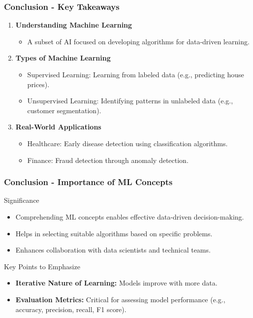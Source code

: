 \documentclass[aspectratio=169]{beamer}
\begin{document}
\begin{frame}[fragile]
    \frametitle{Conclusion - Key Takeaways}
    \begin{enumerate}
        \item \textbf{Understanding Machine Learning}
        \begin{itemize}
            \item A subset of AI focused on developing algorithms for data-driven learning.
        \end{itemize}

        \item \textbf{Types of Machine Learning}
        \begin{itemize}
            \item Supervised Learning: Learning from labeled data (e.g., predicting house prices).
            \item Unsupervised Learning: Identifying patterns in unlabeled data (e.g., customer segmentation).
        \end{itemize}

        \item \textbf{Real-World Applications}
        \begin{itemize}
            \item Healthcare: Early disease detection using classification algorithms.
            \item Finance: Fraud detection through anomaly detection.
        \end{itemize}
    \end{enumerate}
\end{frame}

\begin{frame}[fragile]
    \frametitle{Conclusion - Importance of ML Concepts}
    \begin{block}{Significance}
        \begin{itemize}
            \item Comprehending ML concepts enables effective data-driven decision-making.
            \item Helps in selecting suitable algorithms based on specific problems.
            \item Enhances collaboration with data scientists and technical teams.
        \end{itemize}
    \end{block}
    
    \begin{block}{Key Points to Emphasize}
        \begin{itemize}
            \item \textbf{Iterative Nature of Learning:} Models improve with more data.
            \item \textbf{Evaluation Metrics:} Critical for assessing model performance (e.g., accuracy, precision, recall, F1 score).
        \end{itemize}
    \end{block}
\end{frame}
\end{document}
